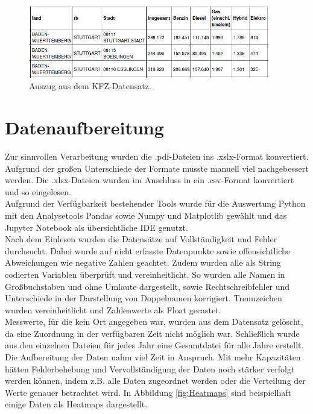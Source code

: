 \documentclass[11pt,a4paper,oneside,german]{article}
\begin{document}
	\begin{figure}[h!]
		\centering
		\includegraphics[width=10.5cm]{BeispielKFZ.png}
		\caption{Auszug aus dem KFZ-Datensatz.}
		\label{fig:BeispielKFZ}
	\end{figure}
	
	\section{Datenaufbereitung}
	
	Zur sinnvollen Verarbeitung wurden die .pdf-Dateien ins .xslx-Format konvertiert. Aufgrund der großen Unterschiede der Formate musste manuell viel nachgebessert werden. Die .xlsx-Dateien wurden im Anschluss in ein .csv-Format konvertiert und so eingelesen.\\
	Aufgrund der Verfügbarkeit bestehender Tools wurde für die Auswertung Python mit den Analysetools Pandas sowie Numpy und Matplotlib gewählt und das Jupyter Notebook als übersichtliche IDE genutzt.\\
	Nach dem Einlesen wurden die Datensätze auf Vollständigkeit und Fehler durchsucht. Dabei wurde auf nicht erfasste Datenpunkte sowie offensichtliche Abweichungen wie negative Zahlen geachtet. Zudem wurden alle als String codierten Variablen überprüft und vereinheitlicht. So wurden alle Namen in Großbuchstaben und ohne Umlaute dargestellt, sowie Rechtschreibfehler und Unterschiede in der Darstellung von Doppelnamen korrigiert. Trennzeichen wurden vereinheitlicht und Zahlenwerte als Float gecastet. \\
	Messwerte, für die kein Ort angegeben war, wurden aus dem Datensatz gelöscht, da eine Zuordnung in der verfügbaren Zeit nicht möglich war. Schließlich wurde aus den einzelnen Dateien für jedes Jahr eine Gesamtdatei für alle Jahre erstellt. \\
	Die Aufbereitung der Daten nahm viel Zeit in Anspruch. Mit mehr Kapazitäten hätten Fehlerbehebung und Vervollständigung der Daten noch stärker verfolgt werden können, indem z.B. alle Daten zugeordnet werden oder die Verteilung der Werte genauer betrachtet wird. In Abbildung \ref{fig:Heatmaps} sind beispielhaft einige Daten als Heatmaps dargestellt.
	
\end{document}
